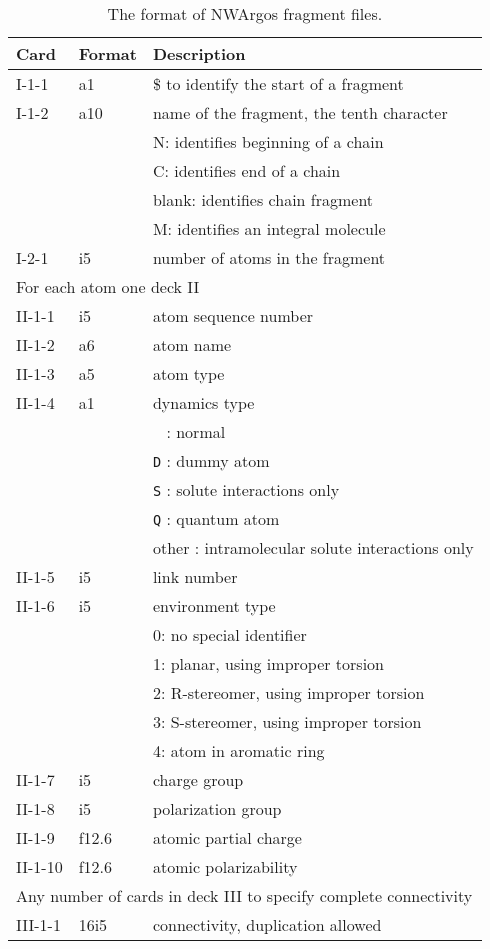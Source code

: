 \begin{table}[htbp]

\label{tbl:nwafrag}

\center

\begin{tabular}{lll}
\hline\hline
Card & Format & Description \\ \hline
I-1-1  & a1     & \$ to identify the start of a fragment \\ %
I-1-2  & a10    & name of the fragment, the tenth character\\
       &        & N: identifies beginning of a chain\\
       &        & C: identifies end of a chain\\
       &        & blank: identifies chain fragment\\
       &        & M: identifies an integral molecule\\
\hline
I-2-1  & i5     & number of atoms in the fragment\\ 
\hline
\multicolumn{3}{l}{For each atom one deck II} \\
\hline
II-1-1  & i5     & atom sequence number \\
II-1-2  & a6     & atom name \\
II-1-3  & a5     & atom type \\
II-1-4  & a1     & dynamics type\\
        &        & \verb+ + : normal\\
        &        & \verb+D+ : dummy atom\\
        &        & \verb+S+ : solute interactions only\\
        &        & \verb+Q+ : quantum atom\\
        &        & other : intramolecular solute interactions only\\
II-1-5  & i5     & link number\\
II-1-6  & i5     & environment type\\
        &        & 0: no special identifier\\
        &        & 1: planar, using improper torsion\\
        &        & 2: R-stereomer, using improper torsion\\
        &        & 3: S-stereomer, using improper torsion\\
        &        & 4: atom in aromatic ring\\
II-1-7  & i5     & charge group\\
II-1-8  & i5     & polarization group\\
II-1-9  & f12.6  & atomic partial charge\\
II-1-10 & f12.6  & atomic polarizability\\
\hline
\multicolumn{3}{l}{Any number of cards in deck III to specify complete 
connectivity} \\
\hline
III-1-1  & 16i5   & connectivity, duplication allowed\\ 
\hline\hline
\end{tabular}

\caption{The format of NWArgos fragment files.}
\end{table}

